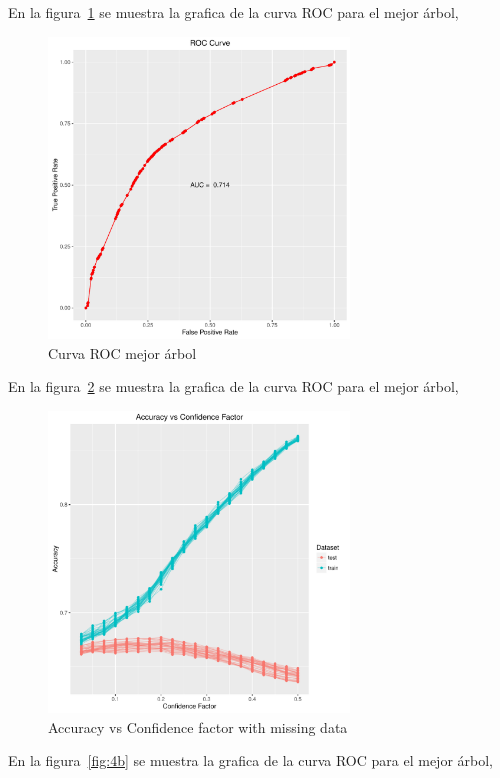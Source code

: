En la figura~\ref{fig:3c} se muestra la grafica de la curva ROC para el mejor árbol,

\begin{figure}
  \centering
  \includegraphics[width = 8cm]{3c.pdf}
  \caption{Curva ROC mejor árbol}
  \label{fig:3c}
\end{figure}

En la figura~\ref{fig:4a} se muestra la grafica de la curva ROC para el mejor árbol,

\begin{figure}
  \centering
  \includegraphics[width = 8cm]{4a.pdf}
  \caption{Accuracy vs Confidence factor with missing data}
  \label{fig:4a}
\end{figure}

En la figura~\ref{fig:4b} se muestra la grafica de la curva ROC para el mejor árbol,

